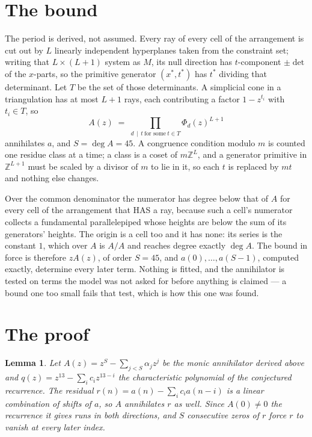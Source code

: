 \documentclass[11pt,a4paper]{article}
\theoremstyle{plain}
\newtheorem{lemma}[theorem]{Lemma}
\theoremstyle{definition}
\begin{document}
\section{The bound}

The period is derived, not assumed. Every ray of every cell of the arrangement is cut out by
$L$ linearly independent hyperplanes taken from the constraint set; writing that $L\times(L+1)$
system as $M$, its null direction has $t$-component $\pm\det$ of the $x$-parts, so the
primitive generator $(x^*,t^*)$ has $t^*$ dividing that determinant. Let $T$ be the set of
those determinants. A simplicial cone in a triangulation has at most $L+1$ rays, each
contributing a factor $1-z^{t_i}$ with $t_i\in T$, so
\[
A(z)\;=\;\prod_{d\,\mid\,t\ \text{for some}\ t\in T}\Phi_d(z)^{L+1}
\]
annihilates $a$, and $S=\deg A=45$. A congruence condition modulo $m$ is counted one residue
class at a time; a class is a coset of $m\mathbb{Z}^L$, and a generator primitive in
$\mathbb{Z}^{L+1}$ must be scaled by a divisor of $m$ to lie in it, so each $t$ is replaced
by $mt$ and nothing else changes.

Over the common denominator the numerator has degree below that of $A$ for every cell of the
arrangement that HAS a ray, because such a cell's numerator collects a fundamental
parallelepiped whose heights are below the sum of its generators' heights. The origin is a cell
too and it has none: its series is the constant $1$, which over $A$ is $A/A$ and reaches degree
exactly $\deg A$. The bound in force is therefore $zA(z)$, of order $S=45$, and
$a(0),\dots,a(S-1)$, computed exactly, determine every later term. Nothing is fitted, and the
annihilator is tested on terms the model was not asked for before anything is claimed --- a
bound one too small fails that test, which is how this one was found.

\section{The proof}

\begin{lemma}\label{lem:crit}
Let $A(z)=z^S-\sum_{j<S}\alpha_jz^{j}$ be the monic annihilator derived above and
$q(z)=z^{13}-\sum_ic_iz^{13-i}$ the characteristic polynomial of the conjectured
recurrence. The residual $r(n)=a(n)-\sum_ic_ia(n-i)$ is a linear combination of shifts of $a$,
so $A$ annihilates $r$ as well. Since $A(0)\ne0$ the recurrence it gives runs in both
directions, and $S$ consecutive zeros of $r$ force $r$ to vanish at every later index.
\end{lemma}
\end{document}

